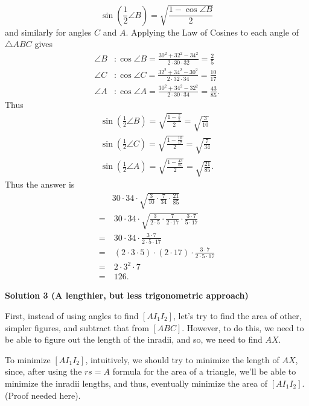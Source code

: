 \begin{enumerate}
 \[\sin\left(\frac{1}{2}\angle B\right)=\sqrt{\frac{1-\cos\angle B}{2}}\] and similarly for angles $C$ and $A$. Applying the Law of Cosines to each angle of $\triangle ABC$ gives 
 \begin{align*}\angle B&:\cos\angle B=\frac{30^{2}+32^{2}-34^{2}}{2\cdot 30\cdot 32}=\frac{2}{5} \\ \angle C&:\cos\angle C=\frac{32^{2}+34^{2}-30^{2}}{2\cdot 32\cdot 34}=\frac{10}{17} \\ \angle A&:\cos\angle A=\frac{30^{2}+34^{2}-32^{2}}{2\cdot 30\cdot 34}=\frac{43}{85}.\end{align*}
 Thus 
 \begin{align*}\sin\left(\frac{1}{2}\angle B\right)=\sqrt{\frac{1-\frac{2}{5}}{2}}=\sqrt{\frac{3}{10}} \\ \sin\left(\frac{1}{2}\angle C\right)=\sqrt{\frac{1-\frac{10}{17}}{2}}=\sqrt{\frac{7}{34}} \\ \sin\left(\frac{1}{2}\angle A\right)=\sqrt{\frac{1-\frac{43}{85}}{2}}=\sqrt{\frac{21}{85}}.\end{align*}
 Thus the answer is 
 \begin{align*} & 30\cdot 34\cdot\sqrt{\frac{3}{10}\cdot\frac{7}{34}\cdot\frac{21}{85}} \\ =&~30\cdot 34\cdot\sqrt{\frac{3}{2\cdot 5}\cdot\frac{7}{2\cdot 17}\cdot\frac{3\cdot 7}{5\cdot 17}} \\ =&~30\cdot 34\cdot\frac{3\cdot 7}{2\cdot 5\cdot 17} \\ =&~(2\cdot 3\cdot 5)\cdot(2\cdot 17)\cdot\frac{3\cdot 7}{2\cdot 5\cdot 17} \\ =&~2\cdot 3^{2}\cdot 7 \\ =&~\boxed{126}.\end{align*}





\textbf{Solution 3 (A lengthier, but less trigonometric approach)}

First, instead of using angles to find $[AI_1I_2]$, let's try to find the area of other, simpler figures, and subtract that from $[ABC]$. However, to do this, we need to be able to figure out the length of the inradii, and so, we need to find $AX$. 

 
To minimize $[AI_1I_2]$, intuitively, we should try to minimize the length of $AX$, since, after using the $rs=A$ formula for the area of a triangle, we'll be able to minimize the inradii lengths, and thus, eventually minimize the area of $[AI_1I_2]$. (Proof needed here).


\end{enumerate}
